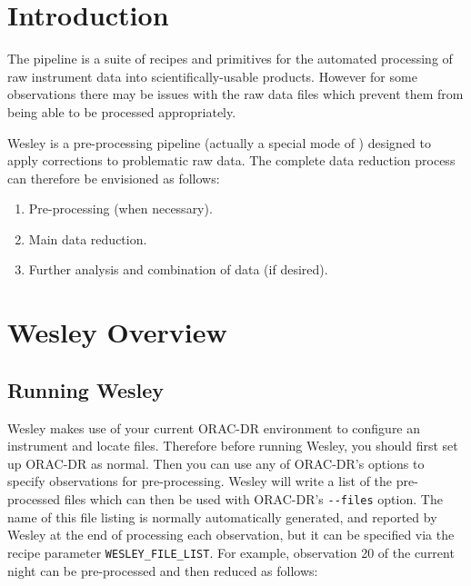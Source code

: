 \documentclass[twoside,11pt,nolof]{starlink}
\begin{document}
\scfrontmatter

\section{Introduction\label{se:intro}}

The \oracdr{} pipeline is a suite of recipes and primitives
for the automated processing of raw instrument data into
scientifically-usable products.
However for some observations there may be
issues with the raw data files which prevent
them from being able to be processed appropriately.

Wesley is a pre-processing pipeline
(actually a special mode of \oracdr{})
designed to apply corrections to problematic raw data.
The complete data reduction process
can therefore be envisioned as follows:

\begin{enumerate}
\item \wesley

Pre-processing (when necessary).

\item \oracdr

Main data reduction.

\item \picard

Further analysis and combination of data (if desired).
\end{enumerate}

\newpage
\section{Wesley Overview\label{se:wesley}}

\subsection{Running Wesley}

Wesley makes use of your current ORAC-DR environment to configure
an instrument and locate files.
Therefore before running Wesley, you should first set up ORAC-DR
as normal.
Then you can use any of ORAC-DR's options to specify observations
for pre-processing.
Wesley will write a list of the pre-processed files which can then
be used with ORAC-DR's \texttt{-{}-files} option.
The name of this file listing is normally automatically generated,
and reported by Wesley at the end of processing each observation,
but it can be specified via the recipe parameter \texttt{WESLEY\_FILE\_LIST}.
For example, observation 20 of the current night can be pre-processed
and then reduced as follows:
\end{document}
